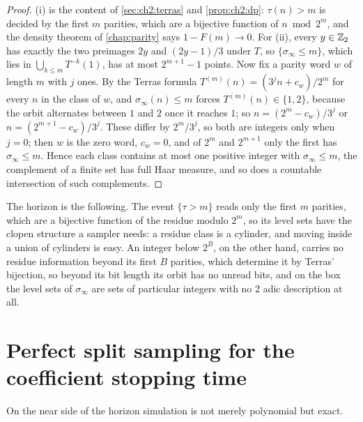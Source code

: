 \begin{proof}
(i) is the content of \cref{sec:ch2:terras} and \cref{prop:ch2:dp}: $\tau(n)>m$
is decided by the first $m$ parities, which are a bijective function of
$n\bmod2^m$, and the density theorem of \cref{chap:parity} says
$1-F(m)\to0$.
For (ii), every $y\in\mathbb{Z}_2$ has exactly the two preimages $2y$ and $(2y-1)/3$ under $T$, so $\{\sigma_\infty\le m\}$, which lies in $\bigcup_{k\le m}T^{-k}(1)$, has at most $2^{m+1}-1$ points.
Now fix a parity word $w$ of length $m$ with $j$ ones. By the Terras formula $T^{(m)}(n)=(3^jn+c_w)/2^m$ for every $n$ in the class of $w$, and $\sigma_\infty(n)\le m$ forces $T^{(m)}(n)\in\{1,2\}$, because the orbit alternates between $1$ and $2$ once it reaches $1$; so $n=(2^m-c_w)/3^j$ or $n=(2^{m+1}-c_w)/3^j$.
These differ by $2^m/3^j$, so both are integers only when $j=0$; then $w$ is the zero word, $c_w=0$, and of $2^m$ and $2^{m+1}$ only the first has $\sigma_\infty\le m$.
Hence each class contains at most one positive integer with $\sigma_\infty\le m$, the complement of a finite set has full Haar measure, and so does a countable intersection of such complements.
\end{proof}

The horizon is the following. The event $\{\tau>m\}$ reads only the first $m$ parities, which are a bijective function of the residue modulo $2^m$, so its level sets have the clopen
structure a sampler needs: a residue class is a cylinder, and moving inside a
union of cylinders is easy. An integer below $2^B$, on the other hand, carries no residue information beyond its first $B$ parities, which determine it by Terras' bijection, so beyond its bit length its orbit has no unread bits, and on the box the level sets of $\sigma_\infty$ are sets of particular integers with no $2$ adic description at all.

\section{Perfect split sampling for the coefficient stopping time}

On the near side of the horizon simulation is not merely polynomial but exact.

